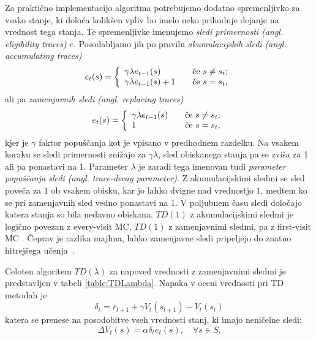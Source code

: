 \documentclass[a4paper, oneside, 12pt]{report}
\begin{document}

Za praktično implementacijo algoritma potrebujemo dodatno spremenljivko za vsako stanje, ki določa kolikšen vpliv bo imelo neko prihodnje dejanje na vrednost tega stanja. Te spremenljivke imenujemo {\em sledi primernosti (angl. eligibility traces)} $e$. Posodabljamo jih po pravilu {\em akumulacijskih sledi (angl. accumulating traces)}
\begin{equation}
e_t(s) = \left\{
\begin{array}{l l}
\gamma \lambda e_{t-1}(s) & \quad \textrm{če $s \ne s_t$};\\
\gamma \lambda e_{t-1}(s) + 1 & \quad \textrm{če $s = s_t$},
\end{array}
\right.
\end{equation}
ali pa {\em zamenjavnih sledi (angl. replacing traces)}
\begin{equation}
e_t(s) = \left\{
\begin{array}{l l}
\gamma \lambda e_{t-1}(s) & \quad \textrm{če $s \ne s_t$};\\
1 & \quad \textrm{če $s = s_t$},
\end{array}
\right.
\end{equation}
kjer je $\gamma$ faktor popuščanja kot je vpisano v predhodnem razdelku. Na vsakem koraku se sledi primernosti znižajo za $\gamma \lambda$, sled obiskanega stanja pa se zviša za 1 ali pa ponastavi na 1. Parameter $\lambda$ je zaradi tega imenovan tudi {\em parameter popuščanja sledi (angl. trace-decay parameter)}. Z akumulacijskimi sledmi se sled poveča za $1$ ob vsakem obisku, kar jo lahko dvigne nad vrednostjo $1$, medtem ko se pri zamenjavnih sled vedno ponastavi na 1. V poljubnem času sledi določajo katera stanja so bila nedavno obiskana. $TD(1)$ z akumulacijskimi sledmi je logično povezan z every-visit MC, $TD(1)$ z zamenjavnimi sledmi, pa z first-visit MC \cite{ReinforcementLearningWithReplacingEligibilityTraces}. Čeprav je razlika majhna, lahko zamenjavne sledi pripeljejo do znatno hitrejšega učenja~\cite{ReinforcementLearningAnIntroduction}.

Celoten algoritem $TD(\lambda)$ za napoved vrednosti z zamenjavnimi sledmi je predstavljen v tabeli \ref{table:TDLambda}. Napaka v oceni vrednosti pri TD metodah je
\begin{equation}
\delta_t = r_{t+1} + \gamma V_t(s_{t+1}) - V_t(s_t)
\end{equation}
katera se prenese na posodobitve vseh vrednosti stanj, ki imajo neničelne sledi:
\begin{equation}
\Delta V_t(s) = \alpha \delta_t e_t(s), \quad \forall s \in S.
\end{equation}
\end{document}
